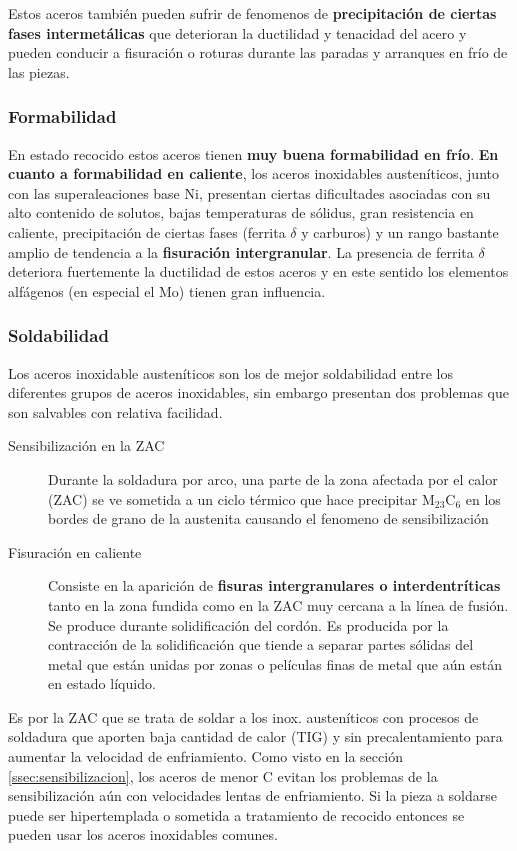 Estos aceros también pueden sufrir de fenomenos de \textbf{precipitación de ciertas fases intermetálicas} que deterioran la ductilidad y tenacidad del acero y pueden conducir a fisuración o roturas durante las paradas y arranques en frío de las piezas.

\subsubsection{Formabilidad}
En estado recocido estos aceros tienen \textbf{muy buena formabilidad en frío}. \textbf{En cuanto a formabilidad en caliente}, los aceros inoxidables austeníticos, junto con las superaleaciones base Ni, presentan ciertas dificultades asociadas con su alto contenido de solutos, bajas temperaturas de sólidus, gran resistencia en caliente, precipitación de ciertas fases (ferrita $\delta$ y carburos) y un rango bastante amplio de tendencia a la \textbf{fisuración intergranular}. La presencia de ferrita $\delta$ deteriora fuertemente la ductilidad de estos aceros y en este sentido los elementos alfágenos (en especial el Mo) tienen gran influencia.


\subsubsection{Soldabilidad}

Los aceros inoxidable austeníticos son los de mejor soldabilidad entre los diferentes grupos de aceros inoxidables, sin embargo presentan dos problemas que son salvables con relativa facilidad.

\begin{description}
	\item[Sensibilización en la ZAC] Durante la soldadura por arco, una parte de la zona afectada por el calor (ZAC) se ve sometida a un ciclo térmico que hace precipitar M$_23$C$_6$ en los bordes de grano de la austenita causando el fenomeno de sensibilización
	\item[Fisuración en caliente] Consiste en la aparición de \textbf{fisuras intergranulares o interdentríticas} tanto en la zona fundida como en la ZAC muy cercana a la línea de fusión. Se produce durante solidificación del cordón. Es producida por la contracción de la solidificación que tiende a separar partes sólidas del metal que están unidas por zonas o películas finas de metal que aún están en estado líquido. 
\end{description}

Es por la ZAC que se trata de soldar a los inox. austeníticos con procesos de soldadura que aporten baja cantidad de calor (TIG) y sin precalentamiento para aumentar la velocidad de enfriamiento. Como visto en la sección \ref{ssec:sensibilizacion}, los aceros de menor C evitan los problemas de la sensibilización aún con velocidades lentas de enfriamiento. Si la pieza a soldarse puede ser hipertemplada o sometida a tratamiento de recocido entonces se pueden usar los aceros inoxidables comunes.


